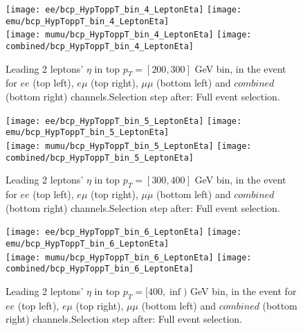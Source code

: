 \documentclass[12pt, a4paper, titlepage]{article}
\begin{document}
\begin{figure}
  \texttt{[image: ee/bcp\_HypToppT\_bin\_4\_LeptonEta]}
  \texttt{[image: emu/bcp\_HypToppT\_bin\_4\_LeptonEta]}\\
  \texttt{[image: mumu/bcp\_HypToppT\_bin\_4\_LeptonEta]}
  \texttt{[image: combined/bcp\_HypToppT\_bin\_4\_LeptonEta]}
\caption{Leading 2 leptons' $\eta$ in top $p_T = [200,300]$ GeV bin, in the event for $ee$ (top left), $e\mu$ (top right), $\mu\mu$ (bottom left) and $combined$ (bottom right) channels.\newline Selection step after: Full event selection.}
\end{figure}

\clearpage
\newpage


\begin{figure}
  \texttt{[image: ee/bcp\_HypToppT\_bin\_5\_LeptonEta]}
  \texttt{[image: emu/bcp\_HypToppT\_bin\_5\_LeptonEta]}\\
  \texttt{[image: mumu/bcp\_HypToppT\_bin\_5\_LeptonEta]}
  \texttt{[image: combined/bcp\_HypToppT\_bin\_5\_LeptonEta]}
\caption{Leading 2 leptons' $\eta$ in top $p_T = [300,400]$ GeV bin, in the event for $ee$ (top left), $e\mu$ (top right), $\mu\mu$ (bottom left) and $combined$ (bottom right) channels.\newline Selection step after: Full event selection.}
\end{figure}

\clearpage
\newpage

\begin{figure}
  \texttt{[image: ee/bcp\_HypToppT\_bin\_6\_LeptonEta]}
  \texttt{[image: emu/bcp\_HypToppT\_bin\_6\_LeptonEta]}\\
  \texttt{[image: mumu/bcp\_HypToppT\_bin\_6\_LeptonEta]}
  \texttt{[image: combined/bcp\_HypToppT\_bin\_6\_LeptonEta]}
\caption{Leading 2 leptons' $\eta$ in top $p_T = [400,\inf)$ GeV bin, in the event for $ee$ (top left), $e\mu$ (top right), $\mu\mu$ (bottom left) and $combined$ (bottom right) channels.\newline Selection step after: Full event selection.}
\end{figure}

\clearpage
\newpage
\end{document}
